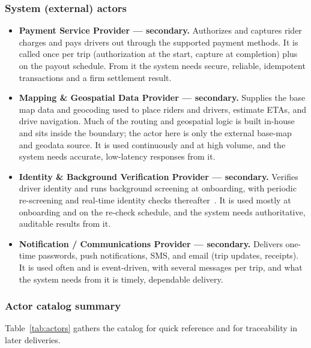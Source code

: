 \subsubsection*{System (external) actors}

\begin{itemize}[leftmargin=1.4em,itemsep=0.2em]
  \item \textbf{Payment Service Provider --- secondary.} Authorizes and
        captures rider charges and pays drivers out through the supported
        payment methods. It is called once per trip (authorization at the
        start, capture at completion) plus on the payout schedule. From it
        the system needs secure, reliable, idempotent transactions and a
        firm settlement result.

  \item \textbf{Mapping \& Geospatial Data Provider --- secondary.} Supplies
        the base map data and geocoding used to place riders and drivers,
        estimate ETAs, and drive navigation. Much of the routing and
        geospatial logic is built in-house and sits inside the boundary; the
        actor here is only the external base-map and geodata source. It is
        used continuously and at high volume, and the system needs accurate,
        low-latency responses from it.

  \item \textbf{Identity \& Background Verification Provider --- secondary.}
        Verifies driver identity and runs background screening at onboarding,
        with periodic re-screening and real-time identity checks
        thereafter~\cite{uberScreening}. It is used mostly at onboarding and
        on the re-check schedule, and the system needs authoritative,
        auditable results from it.

  \item \textbf{Notification / Communications Provider --- secondary.}
        Delivers one-time passwords, push notifications, SMS, and email (trip
        updates, receipts). It is used often and is event-driven, with
        several messages per trip, and what the system needs from it is
        timely, dependable delivery.
\end{itemize}

\subsubsection*{Actor catalog summary}

Table~\ref{tab:actors} gathers the catalog for quick reference and for
traceability in later deliveries.

